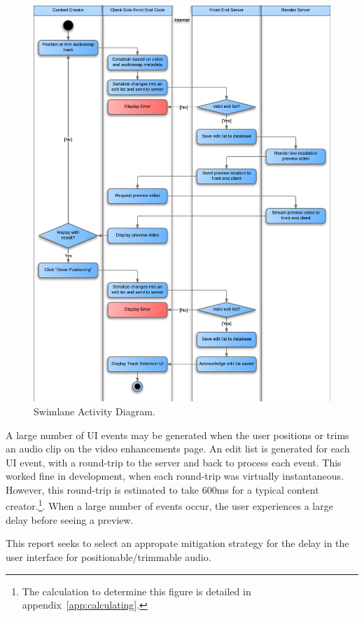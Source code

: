 \documentclass[se,resubmit]{uw-wkrpt}
\begin{document}
\begin{figure}
  \centering
  \includegraphics{swimlane}
  \caption{Swimlane Activity Diagram.}
  \label{fig:swimlane}
\end{figure}

A large number of UI events may be generated when the user positions or
trims an audio clip on the video enhancements page. An edit list is generated
for each UI event, with a round-trip to the server and back to process each
event.  This worked fine in development, when each round-trip was virtually
instantaneous. However, this round-trip is estimated to take 600ms for a
typical content creator.\footnote{The calculation to determine this figure is
detailed in appendix~\ref{app:calculating}.}. When a large number of events
occur, the user experiences a large delay before seeing a preview.

This report seeks to select an appropate mitigation strategy for the delay
in the user interface for positionable/trimmable audio.
\end{document}
